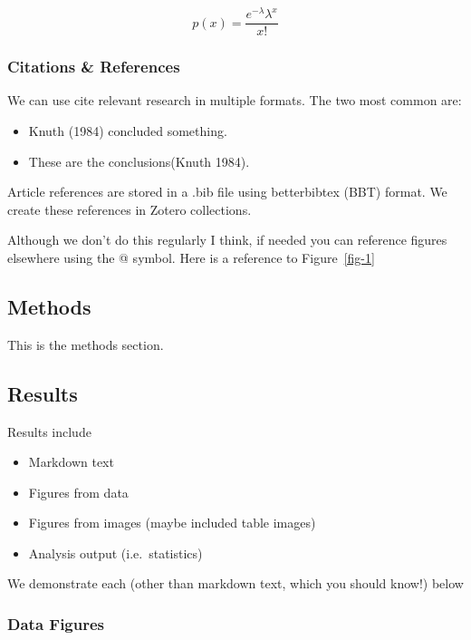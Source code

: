 \documentclass[
  letterpaper,
  DIV=11,
  numbers=noendperiod]{scrartcl}
\providecommand{\tightlist}{%
  \setlength{\itemsep}{0pt}\setlength{\parskip}{0pt}}\usepackage{longtable,booktabs,array}
\begin{document}
\[
p(x) = \frac{e^{-\lambda} \lambda^{x}}{x !}
\]

\subsubsection{Citations \& References}\label{citations-references}

We can use cite relevant research in multiple formats. The two most
common are:

\begin{itemize}
\tightlist
\item
  Knuth (1984) concluded something.\\
\item
  These are the conclusions(Knuth 1984).
\end{itemize}

Article references are stored in a .bib file using betterbibtex (BBT)
format. We create these references in Zotero collections.

Although we don't do this regularly I think, if needed you can reference
figures elsewhere using the @ symbol. Here is a reference to
Figure~\ref{fig-1}

\subsection{Methods}\label{methods}

This is the methods section.

\subsection{Results}\label{results}

Results include

\begin{itemize}
\tightlist
\item
  Markdown text
\item
  Figures from data
\item
  Figures from images (maybe included table images)
\item
  Analysis output (i.e.~statistics)
\end{itemize}

We demonstrate each (other than markdown text, which you should know!)
below

\subsubsection{Data Figures}\label{data-figures}
\end{document}
